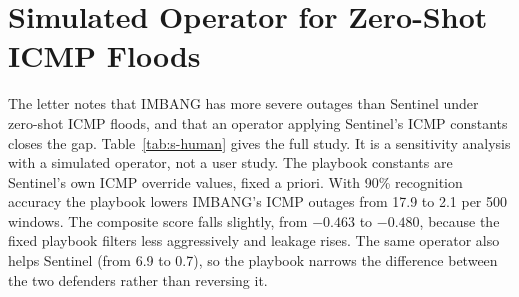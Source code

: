 \documentclass[10pt,journal,onecolumn]{IEEEtran}
\begin{document}


\section{Simulated Operator for Zero-Shot ICMP Floods}
\label{sec:s-human}
The letter notes that IMBANG has more severe outages than Sentinel under zero-shot ICMP floods, and that an operator applying Sentinel's ICMP constants closes the gap. Table~\ref{tab:s-human} gives the full study. It is a sensitivity analysis with a simulated operator, not a user study. The playbook constants are Sentinel's own ICMP override values, fixed a priori. With 90\% recognition accuracy the playbook lowers IMBANG's ICMP outages from 17.9 to 2.1 per 500 windows. The composite score falls slightly, from $-0.463$ to $-0.480$, because the fixed playbook filters less aggressively and leakage rises. The same operator also helps Sentinel (from 6.9 to 0.7), so the playbook narrows the difference between the two defenders rather than reversing it.



\end{document}
